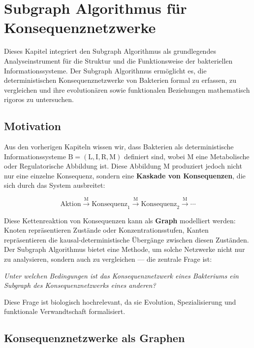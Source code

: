 \documentclass[a4paper,12pt]{article}
\theoremstyle{definition}
\begin{document}
\section{Subgraph Algorithmus für Konsequenznetzwerke}

Dieses Kapitel integriert den Subgraph Algorithmus als grundlegendes Analyseinstrument für die Struktur und die Funktionsweise der bakteriellen Informationssysteme. Der Subgraph Algorithmus ermöglicht es, die deterministischen Konsequenznetzwerke von Bakterien formal zu erfassen, zu vergleichen und ihre evolutionären sowie funktionalen Beziehungen mathematisch rigoros zu untersuchen.

\subsection{Motivation}

Aus den vorherigen Kapiteln wissen wir, dass Bakterien als deterministische Informationssysteme $\text{B} = (\text{L}, \text{I}, \text{R}, \text{M})$ definiert sind, wobei $\text{M}$ eine Metabolische oder Regulatorische Abbildung ist. Diese Abbildung $\text{M}$ produziert jedoch nicht nur eine einzelne Konsequenz, sondern eine \textbf{Kaskade von Konsequenzen}, die sich durch das System ausbreitet:

\[
\text{Aktion} \xrightarrow{\text{M}} \text{Konsequenz}_1 \xrightarrow{\text{M}} \text{Konsequenz}_2 \xrightarrow{\text{M}} \cdots
\]

Diese Kettenreaktion von Konsequenzen kann als \textbf{Graph} modelliert werden: Knoten repräsentieren Zustände oder Konzentrationsstufen, Kanten repräsentieren die kausal-deterministische Übergänge zwischen diesen Zuständen. Der Subgraph Algorithmus bietet eine Methode, um solche Netzwerke nicht nur zu analysieren, sondern auch zu vergleichen --- die zentrale Frage ist:

\textit{Unter welchen Bedingungen ist das Konsequenznetzwerk eines Bakteriums ein Subgraph des Konsequenznetzwerks eines anderen?}

Diese Frage ist biologisch hochrelevant, da sie Evolution, Spezialisierung und funktionale Verwandtschaft formalisiert.

\subsection{Konsequenznetzwerke als Graphen}
\end{document}
